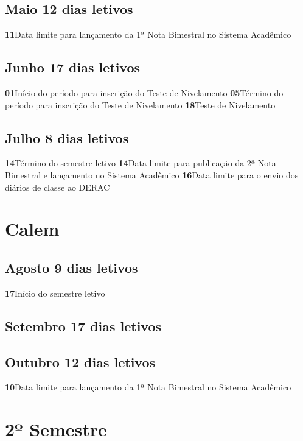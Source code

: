 \documentclass[thesis]{hmcposter}
\begin{document}
\begin{poster}
								\subsection{Maio \hfill 12 dias letivos}\textbf{11}\qquad Data limite para lançamento da 1ª Nota Bimestral no Sistema Acadêmico \newline \null\subsection{Junho \hfill 17 dias letivos}\textbf{01}\qquad Início do período para inscrição do Teste de Nivelamento \newline \null\textbf{05}\qquad Término do período para inscrição do Teste de Nivelamento \newline \null\textbf{18}\qquad Teste de Nivelamento \newline \null\subsection{Julho \hfill 8 dias letivos}\textbf{14}\qquad Término do semestre letivo \newline \null\textbf{14}\qquad Data limite para publicação da 2ª Nota Bimestral e lançamento no Sistema Acadêmico \newline \null\textbf{16}\qquad Data limite para o envio dos diários de classe ao DERAC \newline \null\newpage
\section{\color{hmcorange}Calem}\subsection{Agosto \hfill 9 dias letivos}\textbf{17}\qquad Início do semestre letivo \newline \null\subsection{Setembro \hfill 17 dias letivos}\subsection{Outubro \hfill 12 dias letivos}\textbf{10}\qquad Data limite para lançamento da 1ª Nota Bimestral no Sistema Acadêmico \newline \null\vfill\null
\columnbreak
\section{\hfill \color{hmcorange}2º Semestre}

\end{poster}
\end{document}
